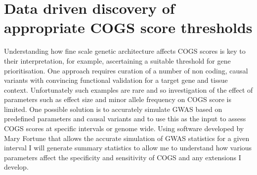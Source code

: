 \documentclass[a4paper,11pt]{report}
\begin{document}

\section{Data driven discovery of appropriate COGS score thresholds}
\label{sect:gwassim}
Understanding how fine scale genetic architecture affects COGS scores is key to their interpretation, for example, ascertaining a suitable threshold for gene prioritisation. One approach requires curation of a number of non coding,  causal variants with convincing functional validation for a target gene and tissue context. Unfortunately such examples are rare and so investigation of the effect of parameters such as effect size and minor allele frequency on COGS score is limited. One possible solution is to accurately simulate GWAS based on predefined parameters and causal variants and to use this as the input to assess COGS scores at specific intervals or genome wide. Using software developed by Mary Fortune that allows the accurate simulation of GWAS statistics for a given interval I will generate  summary statistics to allow me to understand how various parameters affect the specificity and sensitivity of COGS and any extensions I develop.
\end{document}
